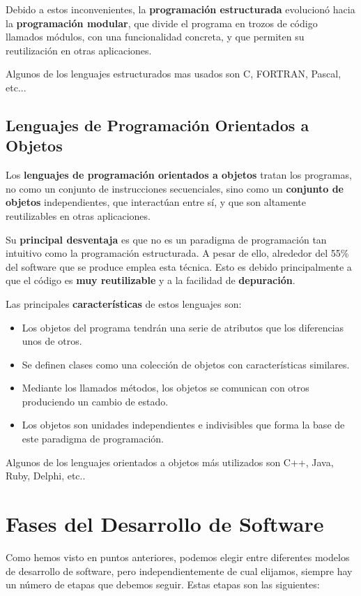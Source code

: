 Debido a estos inconvenientes, la \textbf{programación estructurada} evolucionó hacia la \textbf{programación modular}, que divide el programa en trozos de código llamados módulos, con una funcionalidad concreta, y que permiten su reutilización en otras aplicaciones.

Algunos de los lenguajes estructurados mas usados son C, FORTRAN, Pascal, etc...

\subsection{Lenguajes de Programación Orientados a Objetos}
Los \textbf{lenguajes de programación orientados a objetos} tratan los programas, no como un conjunto de instrucciones secuenciales, sino como un \textbf{conjunto de objetos} independientes, que interactúan entre sí, y que son altamente reutilizables en otras aplicaciones.

Su \textbf{principal desventaja} es que no es un paradigma de programación tan intuitivo como la programación estructurada. A pesar de ello, alrededor del 55\% del software que se produce emplea esta técnica. Esto es debido principalmente a que el código es \textbf{muy reutilizable} y a la facilidad de \textbf{depuración}.

Las principales \textbf{características} de estos lenguajes son:

\begin{itemize}
    \item Los objetos del programa tendrán una serie de atributos que los diferencias unos de otros.
    \item Se definen clases como una colección de objetos con características similares.
    \item Mediante los llamados métodos, los objetos se comunican con otros produciendo un cambio de estado.
    \item Los objetos son unidades independientes e indivisibles que forma la base de este paradigma de programación.
\end{itemize}

Algunos de los lenguajes orientados a objetos más utilizados son C++, Java, Ruby, Delphi, etc..

\section{Fases del Desarrollo de Software}
Como hemos visto en puntos anteriores, podemos elegir entre diferentes modelos de desarrollo de software, pero independientemente de cual elijamos, siempre hay un número de etapas que debemos seguir. Estas etapas son las siguientes:

